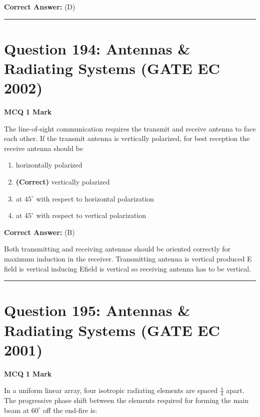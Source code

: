 \documentclass[11pt,a4paper]{article}
\begin{document}
\noindent \textbf{Correct Answer:} (D)


\vspace{1.5em}
\hrule
\vspace{1.5em}

\section*{Question 194: Antennas \& Radiating Systems (GATE EC 2002)}
\noindent \textbf{\color{primary}MCQ} \hfill \textbf{\color{secondary}1 Mark}


\noindent The line-of-sight communication requires the transmit and receive antenna to
face each other. If the transmit antenna is vertically polarized, for best reception
the receive antenna should be


\begin{enumerate}[label=(\Alph*)]
    \item horizontally polarized
    \item \textbf{(Correct)} vertically polarized
    \item at $45^{\circ}$ with respect to horizontal polarization
    \item at $45^{\circ}$ with respect to vertical polarization
\end{enumerate}

\noindent \textbf{Correct Answer:} (B)

\begin{tcolorbox}[solbox, title=Detailed Solution -- Question 194]
Both transmitting and receiving antennas should
be oriented correctly for maximum induction in the
receiver.
Transmitting antenna is vertical produced E field
is vertical inducing Efield is vertical so receiving
antenna has to be vertical.
\end{tcolorbox}

\vspace{1.5em}
\hrule
\vspace{1.5em}

\section*{Question 195: Antennas \& Radiating Systems (GATE EC 2001)}
\noindent \textbf{\color{primary}MCQ} \hfill \textbf{\color{secondary}1 Mark}


\noindent In a uniform linear array, four isotropic radiating elements are spaced $\frac{\lambda }{4}$ apart.
The progressive phase shift between the elements required for forming the main
beam at $60^{\circ}$ off the end-fire is:
\end{document}
